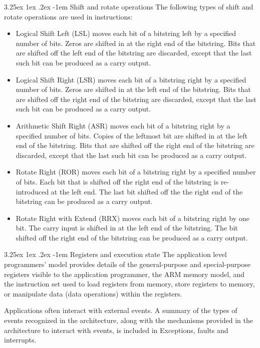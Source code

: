 \documentclass[11pt]{report}
\makeatletter
\renewcommand\paragraph{\@startsection{paragraph}{5}{\z@}%
	{3.25ex \@plus1ex \@minus.2ex}%
	{-1em}%
	{\normalfont\normalsize\bfseries}}
\makeatother
\begin{document}
		\paragraph{Shift and rotate operations} The following types of shift and rotate operations are used in instructions:
		\begin{itemize}
			\item Logical Shift Left (LSL) moves each bit of a bitstring left by a specified number of bits. Zeros are shifted in at the right end of the bitstring. Bits that are shifted off the left end of the bitstring are discarded, except that the last such bit can be produced as a carry output.
			\item Logical Shift Right (LSR) moves each bit of a bitstring right by a specified number of bits. Zeros are shifted in at the left end of the bitstring. Bits that are shifted off the right end of the bitstring are discarded, except that the last such bit can be produced as a carry output.
			\item Arithmetic Shift Right (ASR) moves each bit of a bitstring right by a specified number of bits. Copies of the leftmost bit are shifted in at the left end of the bitstring. Bits that are shifted off the right end of the bitstring are discarded, except that the last such bit can be produced as a carry output.
			\item Rotate Right (ROR) moves each bit of a bitstring right by a specified number of bits. Each bit that is shifted off the right end of the bitstring is re-introduced at the left end. The last bit shifted off the the right end of the bitstring can be produced as a carry output.
			\item Rotate Right with Extend (RRX) moves each bit of a bitstring right by one bit. The carry input is shifted in at the left end of the bitstring. The bit shifted off the right end of the bitstring can be produced as a carry output.
		\end{itemize}
		
		\paragraph{Registers and execution state} The application level programmers’ model provides details of the general-purpose and special-purpose registers visible to the application programmer, the ARM memory model, and the instruction set used to load registers from memory, store registers to memory, or manipulate data (data operations) within the registers.
		\par Applications often interact with external events. A summary of the types of events recognized in the architecture, along with the mechanisms provided in the architecture to interact with events, is included in Exceptions, faults and interrupts. 
		
\end{document}
